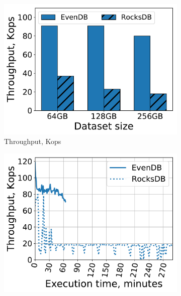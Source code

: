 \documentclass[sigplan,10pt]{acmart}
\providecommand{\DIFaddbeginFL}{} %
\providecommand{\DIFaddendFL}{} %
\providecommand{\DIFdelbeginFL}{} %
\providecommand{\DIFdelendFL}{} %
\begin{document}
\begin{figure}[tb]
\centering
\DIFdelbeginFL %
\DIFdelendFL \DIFaddbeginFL \begin{subfigure}{0.32\linewidth}
\DIFaddendFL \includegraphics[width=\textwidth]{figs/ingestion.pdf}
\caption{Throughput, Kops}
\label{fig:prod:ingestion:a}
\end{subfigure}
\hspace{0.03\linewidth} 
\DIFdelbeginFL %
\DIFdelendFL \DIFaddbeginFL \begin{subfigure}{0.32\linewidth}
\DIFaddendFL \includegraphics[width=\textwidth]{figs/throughput_256_ingestions_line.pdf}

\end{subfigure}
\end{figure}
\end{document}
